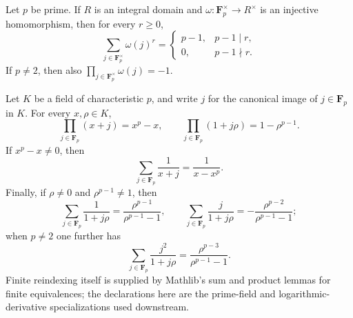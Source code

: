 \begin{theorem}\label{mod:basic-finiteproducts}
Let $p$ be prime.  If $R$ is an integral domain and
$\omega:\mathbf F_p^\times\to R^\times$ is an injective homomorphism, then for
every $r\geq 0$,
\[
 \sum_{j\in\mathbf F_p^\times}\omega(j)^r=
 \begin{cases}
  p-1,&p-1\mid r,\\
  0,&p-1\nmid r.
 \end{cases}
\]
If $p\neq2$, then also
$\prod_{j\in\mathbf F_p^\times}\omega(j)=-1$.

Let $K$ be a field of characteristic $p$, and write $j$ for the canonical
image of $j\in\mathbf F_p$ in $K$.  For every $x,\rho\in K$,
\[
 \prod_{j\in\mathbf F_p}(x+j)=x^p-x,
 \qquad
 \prod_{j\in\mathbf F_p}(1+j\rho)=1-\rho^{p-1}.
\]
If $x^p-x\neq0$, then
\[
 \sum_{j\in\mathbf F_p}\frac1{x+j}=\frac1{x-x^p}.
\]
Finally, if $\rho\neq0$ and $\rho^{p-1}\neq1$, then
\[
 \sum_{j\in\mathbf F_p}\frac1{1+j\rho}
   =\frac{\rho^{p-1}}{\rho^{p-1}-1},
 \qquad
 \sum_{j\in\mathbf F_p}\frac{j}{1+j\rho}
   =-\frac{\rho^{p-2}}{\rho^{p-1}-1};
\]
when $p\neq2$ one further has
\[
 \sum_{j\in\mathbf F_p}\frac{j^2}{1+j\rho}
   =\frac{\rho^{p-3}}{\rho^{p-1}-1}.
\]
Finite reindexing itself is supplied by Mathlib's sum and product lemmas for
finite equivalences; the declarations here are the prime-field and
logarithmic-derivative specializations used downstream.
\leanok
{}
\FormalizationContract
\end{theorem}
